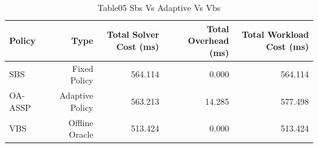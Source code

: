 \begin{table}[htbp]
\centering
\caption{Table05 Sbs Vs Adaptive Vs Vbs}
\begin{tabular}{lrrrr}
\hline
Policy & Type & Total Solver Cost (ms) & Total Overhead (ms) & Total Workload Cost (ms) \\
\hline
SBS & Fixed Policy & 564.114 & 0.000 & 564.114 \\
OA-ASSP & Adaptive Policy & 563.213 & 14.285 & 577.498 \\
VBS & Offline Oracle & 513.424 & 0.000 & 513.424 \\
\hline
\end{tabular}
\end{table}
